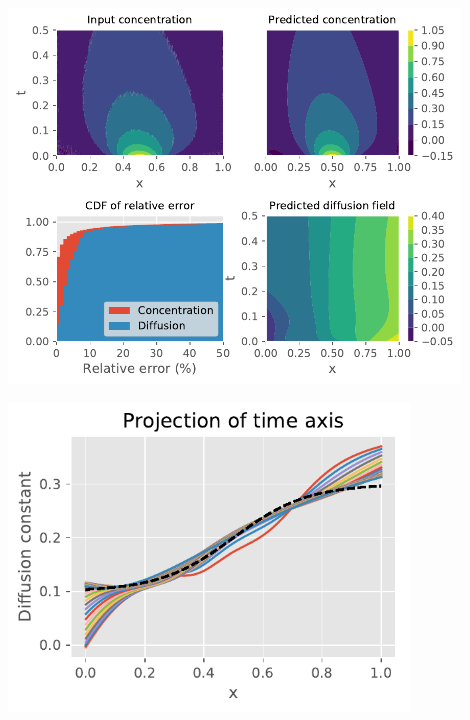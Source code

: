 \documentclass{Dissertate}
\let\origfigure\figure
\let\endorigfigure\endfigure
\renewenvironment{figure}[1][2] {
    \expandafter\origfigure\expandafter[H]
} {
    \endorigfigure
}
\begin{document}
\begin{figure}
\hypertarget{fig:summary_varyingD}{%
\centering
\includegraphics[width=0.9\textwidth]{source/figures/pdf/summary_varyingD_varyingPINN.pdf}
\caption{We show the training data and predicted concentration profile
in the upper left and right panels. The lower right panel shows the
inferred diffusion field while the lower left panel shows the CDF of the
relative error of the diffusion and
concentration.}\label{fig:summary_varyingD}
}
\end{figure}

\begin{figure}
\hypertarget{fig:projectionD}{%
\centering
\includegraphics[width=0.8\textwidth]{source/figures/pdf/projection.pdf}
\caption{Projection of the inferred diffusion profile along the time
axis.}\label{fig:projectionD}
}
\end{figure}
\end{document}
